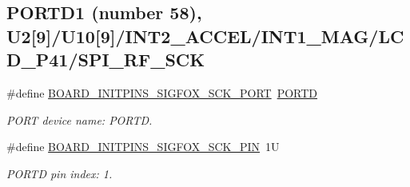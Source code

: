 \subsection*{P\+O\+R\+T\+D1 (number 58), U2\mbox{[}9\mbox{]}/\+U10\mbox{[}9\mbox{]}/\+I\+N\+T2\+\_\+\+A\+C\+C\+E\+L/\+I\+N\+T1\+\_\+\+M\+A\+G/\+L\+C\+D\+\_\+\+P41/\+S\+P\+I\+\_\+\+R\+F\+\_\+\+S\+CK}
\begin{DoxyCompactItemize}
\item 
\mbox{\label{group__pin__mux_ga1b615644f5415db992305bd8663ed017}} 
\#define \mbox{\hyperlink{group__pin__mux_ga1b615644f5415db992305bd8663ed017}{B\+O\+A\+R\+D\+\_\+\+I\+N\+I\+T\+P\+I\+N\+S\+\_\+\+S\+I\+G\+F\+O\+X\+\_\+\+S\+C\+K\+\_\+\+P\+O\+RT}}~\mbox{\hyperlink{group___p_o_r_t___peripheral___access___layer_ga3e6a2517db4f9cb7c9037adf0aefe79b}{P\+O\+R\+TD}}
\begin{DoxyCompactList}\small\item\em P\+O\+RT device name\+: P\+O\+R\+TD. \end{DoxyCompactList}\item 
\mbox{\label{group__pin__mux_gaf5ef9b5a2be54df903cef75d7e528614}} 
\#define \mbox{\hyperlink{group__pin__mux_gaf5ef9b5a2be54df903cef75d7e528614}{B\+O\+A\+R\+D\+\_\+\+I\+N\+I\+T\+P\+I\+N\+S\+\_\+\+S\+I\+G\+F\+O\+X\+\_\+\+S\+C\+K\+\_\+\+P\+IN}}~1U
\begin{DoxyCompactList}\small\item\em P\+O\+R\+TD pin index\+: 1. \end{DoxyCompactList}\end{DoxyCompactItemize}
